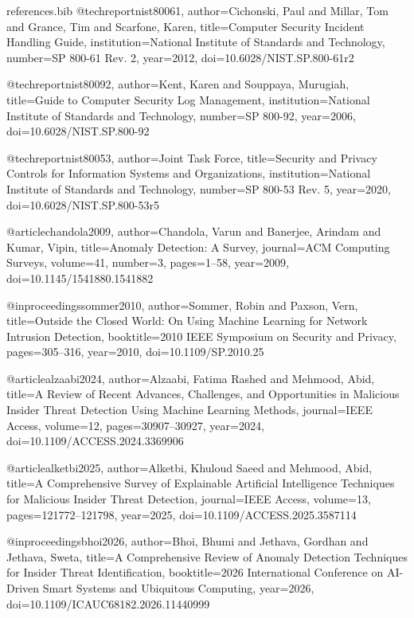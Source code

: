 \begin{filecontents*}{references.bib}
@techreport{nist80061,
  author={Cichonski, Paul and Millar, Tom and Grance, Tim and Scarfone, Karen},
  title={Computer Security Incident Handling Guide},
  institution={National Institute of Standards and Technology},
  number={SP 800-61 Rev. 2},
  year={2012},
  doi={10.6028/NIST.SP.800-61r2}}

@techreport{nist80092,
  author={Kent, Karen and Souppaya, Murugiah},
  title={Guide to Computer Security Log Management},
  institution={National Institute of Standards and Technology},
  number={SP 800-92},
  year={2006},
  doi={10.6028/NIST.SP.800-92}}

@techreport{nist80053,
  author={{Joint Task Force}},
  title={Security and Privacy Controls for Information Systems and Organizations},
  institution={National Institute of Standards and Technology},
  number={SP 800-53 Rev. 5},
  year={2020},
  doi={10.6028/NIST.SP.800-53r5}}

@article{chandola2009,
  author={Chandola, Varun and Banerjee, Arindam and Kumar, Vipin},
  title={Anomaly Detection: A Survey},
  journal={ACM Computing Surveys},
  volume={41},
  number={3},
  pages={1--58},
  year={2009},
  doi={10.1145/1541880.1541882}}

@inproceedings{sommer2010,
  author={Sommer, Robin and Paxson, Vern},
  title={Outside the Closed World: On Using Machine Learning for Network Intrusion Detection},
  booktitle={2010 IEEE Symposium on Security and Privacy},
  pages={305--316},
  year={2010},
  doi={10.1109/SP.2010.25}}

@article{alzaabi2024,
  author={Alzaabi, Fatima Rashed and Mehmood, Abid},
  title={A Review of Recent Advances, Challenges, and Opportunities in Malicious Insider Threat Detection Using Machine Learning Methods},
  journal={IEEE Access},
  volume={12},
  pages={30907--30927},
  year={2024},
  doi={10.1109/ACCESS.2024.3369906}}

@article{alketbi2025,
  author={Alketbi, Khuloud Saeed and Mehmood, Abid},
  title={A Comprehensive Survey of Explainable Artificial Intelligence Techniques for Malicious Insider Threat Detection},
  journal={IEEE Access},
  volume={13},
  pages={121772--121798},
  year={2025},
  doi={10.1109/ACCESS.2025.3587114}}

@inproceedings{bhoi2026,
  author={Bhoi, Bhumi and Jethava, Gordhan and Jethava, Sweta},
  title={A Comprehensive Review of Anomaly Detection Techniques for Insider Threat Identification},
  booktitle={2026 International Conference on AI-Driven Smart Systems and Ubiquitous Computing},
  year={2026},
  doi={10.1109/ICAUC68182.2026.11440999}}


\end{filecontents*}
